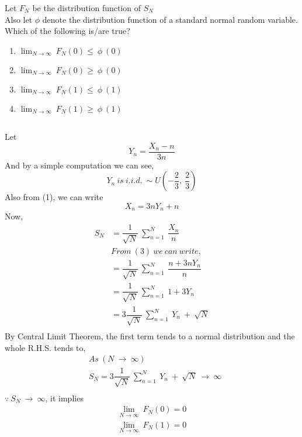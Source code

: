 \documentclass[journal,12pt,twocolumn]{IEEEtran}
\begin{document}
Let $F_N$ be the distribution function of $S_N$\\
Also let $\phi$ denote the distribution function of a standard normal random variable. Which of the following is/are true?\\
\begin{enumerate}
    \item {} $\lim_{N \to \infty}\ F_N(0) \leq\ \phi\ (0)$
    \item {} $\lim_{N \to \infty}\ F_N(0) \geq\ \phi\ (0)$
    \item {} $\lim_{N \to \infty}\ F_N(1) \leq\ \phi\ (1)$
    \item {} $\lim_{N \to \infty}\ F_N(1) \geq\ \phi\ (1)$
\end{enumerate}
\subsection*{}
Let 
\begin{equation}\tag{1}
    Y_n = \dfrac{X_n - n}{3n}
\end{equation}
And by a simple computation we can see,
\begin{equation}\tag{2}
    Y_n\ is\ i.i.d.\ \sim U(-\dfrac{2}{3},\ \dfrac{2}{3})
\end{equation}
Also from (1), we can write 
\begin{equation}\tag{3}
    X_n = 3nY_n + n
\end{equation}
Now,
\begin{equation}\tag{4}
    \begin{split}
        S_N &= \dfrac{1}{\sqrt{N}}\ \sum_{n=1}^{N}\ \dfrac{X_n}{n}\\
            &From\ (3)\ we\ can\ write,\\
            &= \dfrac{1}{\sqrt{N}}\ \sum_{n=1}^{N}\ \dfrac{n + 3nY_n}{n}\\
            &= \dfrac{1}{\sqrt{N}}\ \sum_{n=1}^{N}\ 1 + 3Y_n\\
            &= 3\dfrac{1}{\sqrt{N}}\ \sum_{n=1}^{N}\ Y_n\ +\ \sqrt{N}\\
    \end{split}
\end{equation}
By Central Limit Theorem, the first term tends to a normal distribution and the whole R.H.S. tends to,\\
\begin{equation}\tag{5}
    \begin{split}
        &As\ (N\ \rightarrow\ \infty)\\
        &S_N = 3\dfrac{1}{\sqrt{N}}\ \sum_{n=1}^{N}\ Y_n\ +\ \sqrt{N}\ \longrightarrow\ \infty\\
    \end{split}
\end{equation}
$\because\ S_N\ \rightarrow\ \infty$, it implies  
\begin{equation}\tag{6}
    \begin{split}
        \lim_{N \to \infty}\ F_N(0) = 0\\
        \lim_{N \to \infty}\ F_N(1) = 0
    \end{split}
\end{equation}
\end{document}
